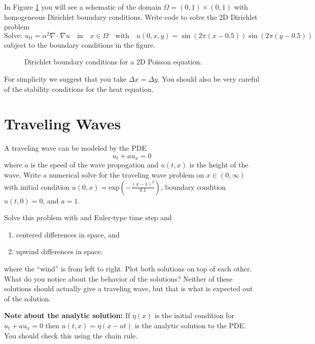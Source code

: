 \begin{problem}
    In Figure \ref{fig:2DWave_BC} you will see a schematic of the domain
    $\Omega=(0,1)\times (0,1)$ with homogeneous Dirichlet boundary conditions.  Write code
    to solve the 2D Dirichlet problem
    \[ \text{Solve: } u_{tt} = \alpha^2 \nabla \cdot \nabla u  \quad \text{in} \quad x \in \Omega \quad \text{with} \quad
    u(0,x,y) = \sin(2\pi (x-0.5))\sin(2\pi(y-0.5)) \]
    subject to the boundary conditions in the figure.

    \begin{figure}[ht!]
        \centering
        \caption{Dirichlet boundary conditions for a 2D Poisson equation.}
        \label{fig:2DWave_BC}
    \end{figure}
    For simplicity we suggest that you take $\Delta x = \Delta y$.  You should also be
    very careful of the stability conditions for the heat equation.  
\end{problem}


\section{Traveling Waves}

\begin{problem}
    A traveling wave can be modeled by the PDE
    \[ u_t + a u_x = 0 \]
    where $a$ is the speed of the wave propogation and $u(t,x)$ is the height of the wave.
    Write a numerical solve for the traveling wave problem on $x \in (0,\infty)$ with initial condition $u(0,x)
    = \text{exp}\left( -\frac{(x-1)^2}{0.1} \right)$, boundary condition $u(t,0) = 0$, and $a=1$.

    Solve this problem with and Euler-type time step and
    \begin{enumerate}
        \item centered differences in space, and
        \item upwind differences in space.
    \end{enumerate}
    where the ``wind'' is from left to right.  Plot both solutions on top of each
    other.  What do you notice about the behavior of the solutions?  Neither of these
    solutions should actually give a traveling wave, but that is what is
    expected out of the solution.  

    {\bf Note about the analytic solution:} If $\eta(x)$ is the initial condition for $u_t + a u_x = 0$ then
    $u(t,x) = \eta(x-at)$ is the analytic solution to the PDE.  You should check this
    using the chain rule.
\end{problem}


